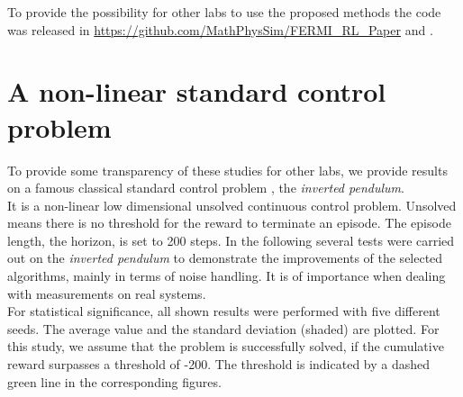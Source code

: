 \documentclass[
reprint,
amsmath,amssymb,amsfonts,clevref,
aps,
prstab,
]{revtex4-2}
\begin{document}
 To provide the possibility for other labs to use the proposed methods the code was released in \url{https://github.com/MathPhysSim/FERMI_RL_Paper} and \cite{Hirlaender2020}.
 \vfill
 \newpage
 \vfill
  \newpage
	\appendix
	\section{A non-linear standard control problem}
	To provide some transparency of these studies for other labs, we provide results on a famous classical standard control problem \cite{Furutaa}, the \emph{inverted pendulum}.\\
	 It is a non-linear low dimensional unsolved continuous control problem. Unsolved means there is no threshold for the reward to terminate an episode. The episode length, the horizon, is set to 200 steps. In the following several tests were carried out on the \emph{inverted pendulum} to demonstrate the improvements of the selected algorithms, mainly in terms of noise handling. It is of importance when dealing with measurements on real systems.\\
	 For statistical significance, all shown results were performed with five different seeds. The average value and the standard deviation (shaded) are plotted. For this study, we assume that the problem is successfully solved, if the cumulative reward surpasses a threshold of -200. The threshold is indicated by a dashed green line in the corresponding figures.
	
\end{document}
